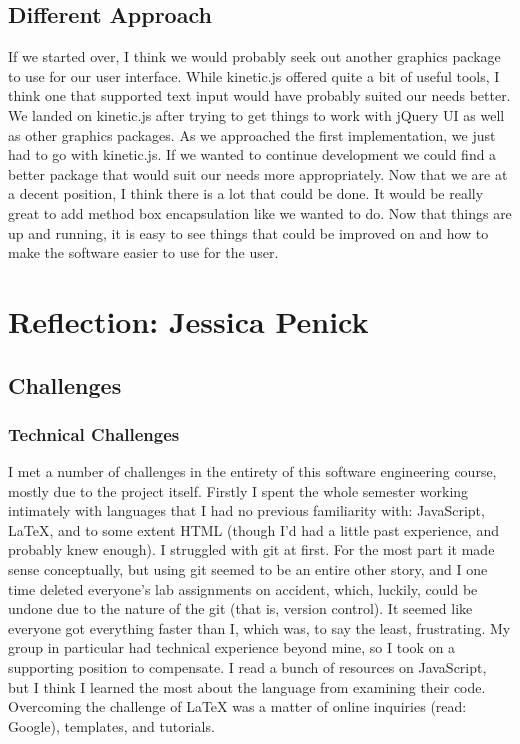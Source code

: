 \documentclass[a4paper]{article}
\begin{document}
\subsection{Different Approach}
If we started over, I think we would probably seek out another graphics package to use for our user interface. While kinetic.js offered quite a bit of useful tools, I think one that supported text input would have probably suited our needs better. We landed on kinetic.js after trying to get things to work with jQuery UI as well as other graphics packages. As we approached the first implementation, we just had to go with kinetic.js. If we wanted to continue development we could find a better package that would suit our needs more appropriately. Now that we are at a decent position, I think there is a lot that could be done. It would be really great to add method box encapsulation like we wanted to do. Now that things are up and running, it is easy to see things that could be improved on and how to make the software easier to use for the user. 


\section{Reflection: Jessica Penick}
\subsection{Challenges}
\subsubsection{Technical Challenges}
I met a number of challenges in the entirety of this software engineering course, mostly due to the project itself. Firstly I spent the whole semester working intimately with languages that I had no previous familiarity with: JavaScript, LaTeX, and to some extent HTML (though I'd had a little past experience, and probably knew enough). I struggled with git at first. For the most part it made sense conceptually, but using git seemed to be an entire other story, and I one time deleted everyone's lab assignments on accident, which, luckily, could be undone due to the nature of the git (that is, version control). It seemed like everyone got everything faster than I, which was, to say the least, frustrating. My group in particular had technical experience beyond mine, so I took on a supporting position to compensate. I read a bunch of resources on JavaScript, but I think I learned the most about the language from examining their code. Overcoming the challenge of LaTeX was a matter of online inquiries (read: Google), templates, and tutorials.
\end{document}
